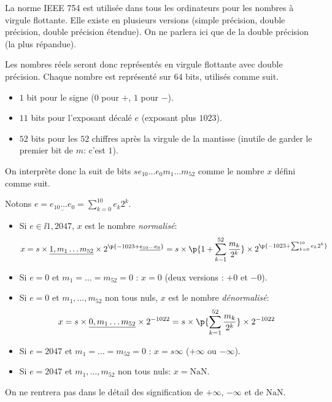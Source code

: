 La norme IEEE 754 est utilisée dans tous les ordinateurs pour les nombres à
  virgule flottante. Elle existe en plusieurs versions (simple précision, double précision, double
  précision étendue). On ne parlera ici que de la double précision (la plus répandue).


Les nombres réels seront donc représentés en virgule flottante avec double précision. Chaque nombre est  représenté sur $64$ bits, utilisés comme suit.
\begin{itemize}
\item[\textbullet] $1$ bit pour le signe ($0$ pour $+$, $1$ pour $-$).
\item[\textbullet] $11$ bits pour l'exposant décalé $e$ (exposant plus $1023$).
\item[\textbullet] $52$ bits pour les $52$ chiffres après la virgule de la mantisse
  (inutile de garder le premier bit de $m$: c'est $1$).
\end{itemize}

On interprète donc la suit de bits $se_{10}\ldots e_{0}m_{1}\ldots m_{52}$ comme le nombre $x$ défini comme suit. 

Notons $\displaystyle e  = \underline{e_{10}\ldots e_{0}} = \sum_{k=0}^{10} e_k2^k$. 
\begin{itemize}
  \item Si $e\in\ii{1,2047}$, $x$ est le  nombre \emph{normalisé}:
\begin{equation*}
  x = s \times \underline{1,m_{1}\ldots m_{52}}\times
  2^{\p{-1023+\underline{e_{10}\ldots  e_{0}}}}
  = 
  s \times \p{1+\sum_{k=1}^{52} \frac{m_{k}}{2^{k}}}
  \times 2^{\p{-1023 + \sum_{k=0}^{10} e_{k}2^{k}}}
\end{equation*}

\item Si $e = 0$ et $m_{1}=\dots=m_{52}=0$ : $x=0$ (deux
  versions : $+0$ et $-0$).

\item  Si $e = 0$ et $m_{1},\ldots,m_{52}$ non tous nuls, $x$ est le nombre
\emph{dénormalisé}:
\begin{equation*}
  x = s \times \underline{0,m_{1}\ldots m_{52}}\times
  2^{-1022}
  = 
  s \times \p{\sum_{k=1}^{52} \frac{m_{k}}{2^{k}}}
  \times 2^{-1022}
\end{equation*}

\item  Si $e= 2047$ et $m_{1}=\ldots= m_{52}=0$ : $x = s\infty$ ($+\infty$
ou $-\infty$).

\item  Si $e = 2047$ et $m_{1},\ldots, m_{52}$ non tous nuls: $x=\text{NaN}$.
\end{itemize}
\begin{rem}
  On ne rentrera pas dans le détail des signification de $+\infty$, $-\infty$ et de $\text{NaN}$.
\end{rem}


